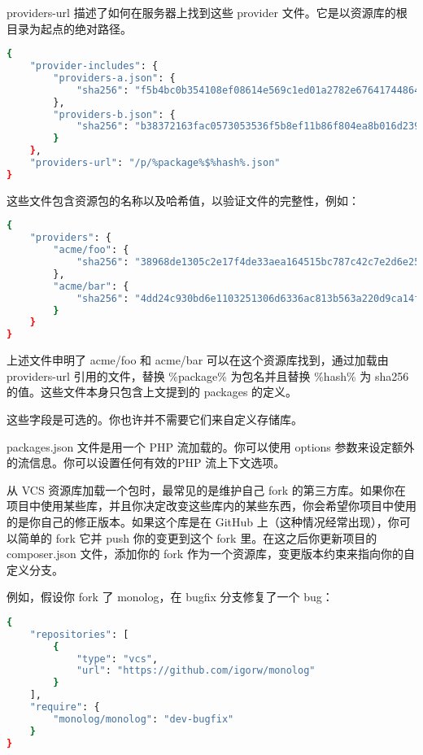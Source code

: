 providers-url 描述了如何在服务器上找到这些 provider 文件。它是以资源库的根目录为起点的绝对路径。

\begin{lstlisting}[language=bash]
{
    "provider-includes": {
        "providers-a.json": {
            "sha256": "f5b4bc0b354108ef08614e569c1ed01a2782e67641744864a74e788982886f4c"
        },
        "providers-b.json": {
            "sha256": "b38372163fac0573053536f5b8ef11b86f804ea8b016d239e706191203f6efac"
        }
    },
    "providers-url": "/p/%package%$%hash%.json"
}
\end{lstlisting}

这些文件包含资源包的名称以及哈希值，以验证文件的完整性，例如：



\begin{lstlisting}[language=bash]
{
    "providers": {
        "acme/foo": {
            "sha256": "38968de1305c2e17f4de33aea164515bc787c42c7e2d6e25948539a14268bb82"
        },
        "acme/bar": {
            "sha256": "4dd24c930bd6e1103251306d6336ac813b563a220d9ca14f4743c032fb047233"
        }
    }
}
\end{lstlisting}

上述文件申明了 acme/foo 和 acme/bar 可以在这个资源库找到，通过加载由 providers-url 引用的文件，替换 \%package\% 为包名并且替换 \%hash\% 为 sha256 的值。这些文件本身只包含上文提到的 packages 的定义。

这些字段是可选的。你也许并不需要它们来自定义存储库。


packages.json 文件是用一个 PHP 流加载的。你可以使用 options 参数来设定额外的流信息。你可以设置任何有效的PHP 流上下文选项。

从 VCS 资源库加载一个包时，最常见的是维护自己 fork 的第三方库。如果你在项目中使用某些库，并且你决定改变这些库内的某些东西，你会希望你项目中使用的是你自己的修正版本。如果这个库是在 GitHub 上（这种情况经常出现），你可以简单的 fork 它并 push 你的变更到这个 fork 里。在这之后你更新项目的 composer.json 文件，添加你的 fork 作为一个资源库，变更版本约束来指向你的自定义分支。


例如，假设你 fork 了 monolog，在 bugfix 分支修复了一个 bug：



\begin{lstlisting}[language=bash]
{
    "repositories": [
        {
            "type": "vcs",
            "url": "https://github.com/igorw/monolog"
        }
    ],
    "require": {
        "monolog/monolog": "dev-bugfix"
    }
}
\end{lstlisting}

